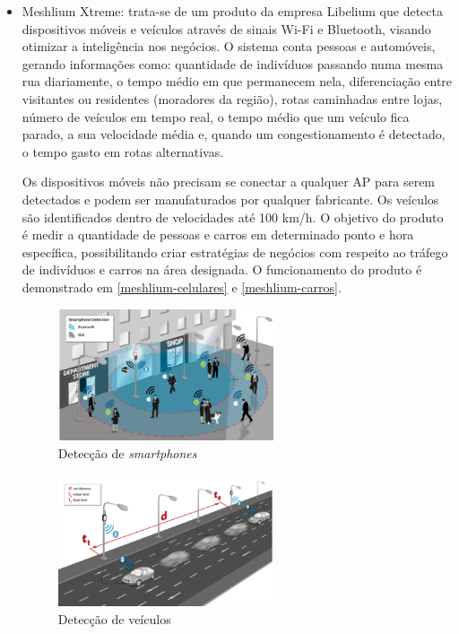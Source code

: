 \begin{itemize}
\item Meshlium Xtreme: trata-se de um produto da empresa Libelium que detecta dispositivos móveis e veículos através de sinais Wi-Fi e Bluetooth, visando otimizar a inteligência nos negócios. O sistema conta pessoas e automóveis, gerando informações \cite{libelium} como: quantidade de indivíduos passando numa mesma rua diariamente, o tempo médio em que permanecem nela, diferenciação entre visitantes ou residentes (moradores da região), rotas caminhadas entre lojas, número de veículos em tempo real, o tempo médio que um veículo fica parado, a sua velocidade média e, quando um congestionamento é detectado, o tempo gasto em rotas alternativas.

Os dispositivos móveis não precisam se conectar a qualquer AP para serem detectados e podem ser manufaturados por qualquer fabricante. Os veículos são identificados dentro de velocidades até 100 km/h. O objetivo do produto é medir a quantidade de pessoas e carros em determinado ponto e hora específica, possibilitando criar estratégias de negócios com respeito ao tráfego de indivíduos e carros na área designada. 
O funcionamento do produto é demonstrado em \autoref{meshlium-celulares} e \autoref{meshlium-carros}.

\begin{figure}[htb]
  \caption{\label{meshlium-celulares}Detecção de \emph{smartphones}}
  \begin{center}
    \includegraphics[width=0.60\textwidth]{img/meshlium-celulares.png}
  \end{center}
\end{figure}

\begin{figure}[htb]
  \caption{\label{meshlium-carros}Detecção de veículos}
  \begin{center}
    \includegraphics[width=0.60\textwidth]{img/meshlium-carros.png}
  \end{center}
\end{figure}


\end{itemize}
